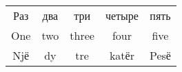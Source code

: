 \documentclass{article}
\begin{document}
\begin{tabular}{c|c|c|c|c}
Раз & два & три & четыре & пять \\
One & two & three & four & five \\
Njё & dy & tre & katёr & Pesё
\end{tabular}
\end{document}
